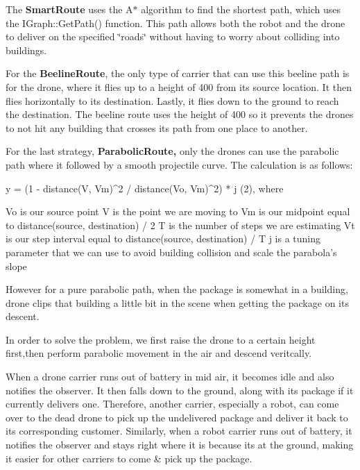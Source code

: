 The {\bfseries Smart\+Route} uses the A$\ast$ algorithm to find the shortest path, which uses the I\+Graph\+::\+Get\+Path() function. This path allows both the robot and the drone to deliver on the specified \char`\"{}roads\char`\"{} without having to worry about colliding into buildings.

For the {\bfseries Beeline\+Route}, the only type of carrier that can use this beeline path is for the drone, where it flies up to a height of 400 from its source location. It then flies horizontally to its destination. Lastly, it flies down to the ground to reach the destination. The beeline route uses the height of 400 so it prevents the drones to not hit any building that crosses its path from one place to another.

For the last strategy, {\bfseries Parabolic\+Route,} only the drones can use the parabolic path where it followed by a smooth projectile curve. The calculation is as follows\+: 
\begin{DoxyPre}
y = (1 - distance(V, Vm)^2 / distance(Vo, Vm)^2) * j (2), where\end{DoxyPre}



\begin{DoxyPre}Vo is our source point
V is the point we are moving to
Vm is our midpoint equal to distance(source, destination) / 2
T is the number of steps we are estimating
Vt is our step interval equal to distance(source, destination) / T
j is a tuning parameter that we can use to avoid building collision and scale the parabola's slope
\end{DoxyPre}
 However for a pure parabolic path, when the package is somewhat in a building, drone clips that building a little bit in the scene when getting the package on its descent.

In order to solve the problem, we first raise the drone to a certain height first,then perform parabolic movement in the air and descend veritcally.

When a drone carrier runs out of battery in mid air, it becomes idle and also notifies the observer. It then falls down to the ground, along with its package if it currently delivers one. Therefore, another carrier, especially a robot, can come over to the dead drone to pick up the undelivered package and deliver it back to its corresponding customer. Similarly, when a robot carrier runs out of battery, it notifies the observer and stays right where it is because it\textquotesingle{}s at the ground, making it easier for other carriers to come \& pick up the package.

